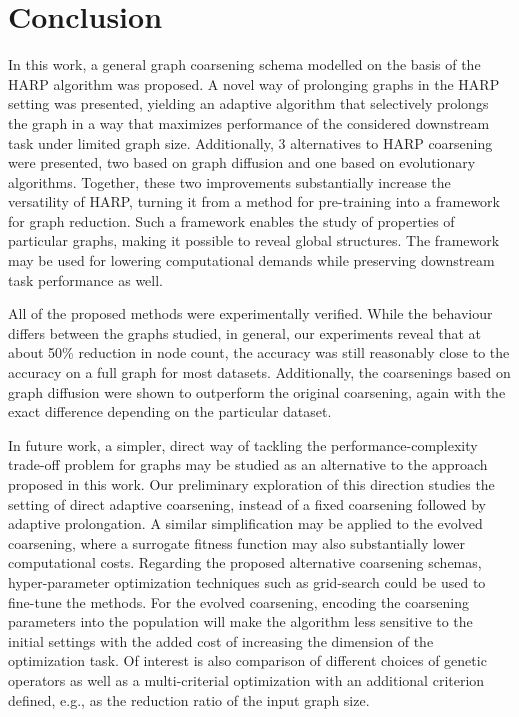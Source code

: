 \section{Conclusion}

In this work, a general graph coarsening schema modelled on the basis of the HARP algorithm was proposed. A novel way of prolonging graphs in the HARP setting was presented, yielding an adaptive algorithm that selectively prolongs the graph in a way that maximizes performance of the considered downstream task under limited graph size. Additionally, 3 alternatives to HARP coarsening were presented, two based on graph diffusion and one based on evolutionary algorithms. Together, these two improvements substantially increase the versatility of HARP, turning it from a method for pre-training into a framework for graph reduction. Such a framework enables the study of properties of particular graphs, making it possible to reveal global structures. The framework may be used for lowering computational demands while preserving downstream task performance as well.

All of the proposed methods were experimentally verified. While the behaviour differs between the graphs studied, in general, our experiments reveal that at about 50\% reduction in node count, the accuracy was still reasonably close to the accuracy on a full graph for most datasets. Additionally, the coarsenings based on graph diffusion were shown to outperform the original coarsening, again with the exact difference depending on the particular dataset.

In future work, a simpler, direct way of tackling the performance-complexity trade-off problem for graphs may be studied as an alternative to the approach proposed in this work. Our preliminary exploration of this direction \cite{prochazka_downstream_2022} studies the setting of direct adaptive coarsening, instead of a fixed coarsening followed by adaptive prolongation. A similar simplification may be applied to the evolved coarsening, where a surrogate fitness function may also substantially lower computational costs. Regarding the proposed alternative coarsening schemas, hyper-parameter optimization techniques such as grid-search could be used to fine-tune the methods. For the evolved coarsening, encoding the coarsening parameters into the population will make the algorithm less sensitive to the initial settings with the added cost of increasing the dimension of the optimization task. Of interest is also comparison of different choices of genetic operators as well as a multi-criterial optimization with an additional criterion defined, e.g., as the reduction ratio of the input graph size.
